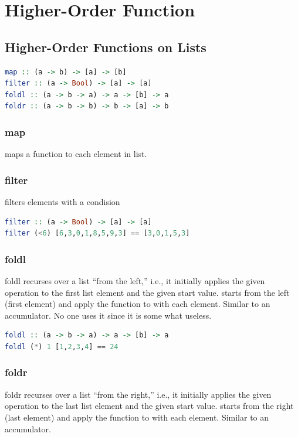 \newpage

\section{Higher-Order Function}
\subsection{Higher-Order Functions on Lists}
\begin{lstlisting}[language=Haskell]
map :: (a -> b) -> [a] -> [b]
filter :: (a -> Bool) -> [a] -> [a]
foldl :: (a -> b -> a) -> a -> [b] -> a
foldr :: (a -> b -> b) -> b -> [a] -> b  
\end{lstlisting}

\subsubsection{map}
maps a function to each element in list.

\subsubsection{filter}
filters elements with a condision

\begin{lstlisting}[language=Haskell]
filter :: (a -> Bool) -> [a] -> [a]
filter (<6) [6,3,0,1,8,5,9,3] == [3,0,1,5,3]
\end{lstlisting}

\subsubsection{foldl}
foldl recurses over a list “from the left,” i.e., it initially applies the
given operation to the first list element and the given start value.
starts from the left (first element) and apply the function to with each element.
Similar to an accumulator. No one uses it since it is some what useless.
\begin{lstlisting}[language=Haskell]
foldl :: (a -> b -> a) -> a -> [b] -> a
foldl (*) 1 [1,2,3,4] == 24
\end{lstlisting}

\subsubsection{foldr}
foldr recurses over a list “from the right,” i.e., it initially applies the
given operation to the last list element and the given start value.
starts from the right (last element) and apply the function to with each element.
Similar to an accumulator.

